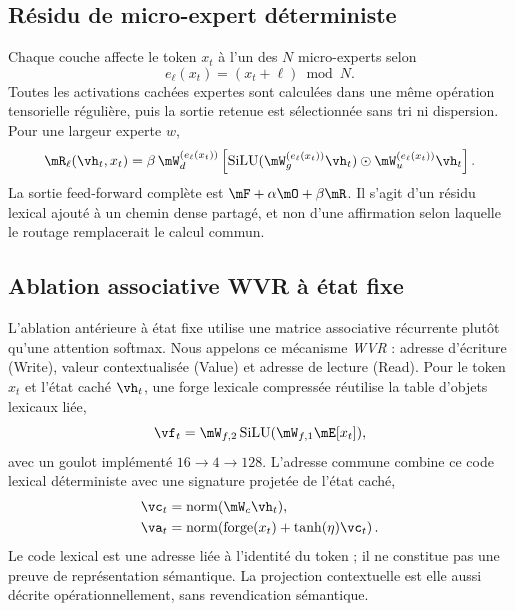 \subsection{Résidu de micro-expert déterministe}

Chaque couche affecte le token $x_t$ à l'un des $N$ micro-experts selon
\begin{equation}
    e_\ell(x_t)=(x_t+\ell)\bmod N.
\end{equation}
Toutes les activations cachées expertes sont calculées dans une même opération tensorielle régulière, puis la sortie retenue est sélectionnée sans tri ni dispersion. Pour une largeur experte $w$,
\begin{equation}
    \mR_\ell(\vh_t,x_t)=\beta\,\mW^{(e_\ell(x_t))}_{d}
    \left[\operatorname{SiLU}(\mW^{(e_\ell(x_t))}_{g}\vh_t)
    \odot \mW^{(e_\ell(x_t))}_{u}\vh_t\right].
\end{equation}
La sortie feed-forward complète est $\mF+\alpha\mO+\beta\mR$. Il s'agit d'un résidu lexical ajouté à un chemin dense partagé, et non d'une affirmation selon laquelle le routage remplacerait le calcul commun.

\subsection{Ablation associative WVR à état fixe}

L'ablation antérieure à état fixe utilise une matrice associative récurrente plutôt qu'une attention softmax. Nous appelons ce mécanisme \emph{WVR} : adresse d'écriture (Write), valeur contextualisée (Value) et adresse de lecture (Read). Pour le token $x_t$ et l'état caché $\vh_t$, une forge lexicale compressée réutilise la table d'objets lexicaux liée,
\begin{equation}
    \vf_t=\mW_{f,2}\operatorname{SiLU}(\mW_{f,1}\mE[x_t]),
\end{equation}
avec un goulot implémenté $16\rightarrow4\rightarrow128$. L'adresse commune combine ce code lexical déterministe avec une signature projetée de l'état caché,
\begin{align}
    \vc_t &= \operatorname{norm}(\mW_c\vh_t),\\
    \va_t &= \operatorname{norm}\!\left(\operatorname{forge}(x_t)+
        \tanh(\eta)\vc_t\right).
\end{align}
Le code lexical est une adresse liée à l'identité du token ; il ne constitue pas une preuve de représentation sémantique. La projection contextuelle est elle aussi décrite opérationnellement, sans revendication sémantique.

